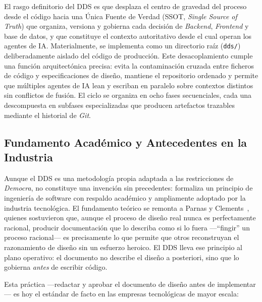 El rasgo definitorio del DDS es que desplaza el centro de gravedad del proceso
desde el código hacia una Única Fuente de Verdad (SSOT, \textit{Single Source of
Truth}) que organiza, versiona y gobierna cada decisión de \textit{Backend},
\textit{Frontend} y base de datos, y que constituye el contexto autoritativo desde
el cual operan los agentes de IA. Materialmente, se implementa como un directorio
raíz (\texttt{dds/}) deliberadamente aislado del código de producción. Este
desacoplamiento cumple una función arquitectónica precisa: evita la contaminación
cruzada entre ficheros de código y especificaciones de diseño, mantiene el
repositorio ordenado y permite que múltiples agentes de IA lean y escriban en
paralelo sobre contextos distintos sin conflictos de fusión. El ciclo se organiza
en ocho fases secuenciales, cada una descompuesta en subfases especializadas que
producen artefactos trazables mediante el historial de \textit{Git}.

\subsection{Fundamento Académico y Antecedentes en la Industria}
\label{subsec:dds_antecedentes}

Aunque el DDS es una metodología propia adaptada a las restricciones de
\textit{Democra}, no constituye una invención sin precedentes: formaliza un
principio de ingeniería de software con respaldo académico y ampliamente adoptado
por la industria tecnológica. El fundamento teórico se remonta a Parnas y
Clements~\cite{parnas1986}, quienes sostuvieron que, aunque el proceso de diseño
real nunca es perfectamente racional, producir documentación que lo describa como
si lo fuera ---``fingir'' un proceso racional--- es precisamente lo que permite que
otros reconstruyan el razonamiento de diseño sin un esfuerzo heroico. El DDS lleva
ese principio al plano operativo: el documento no describe el diseño a posteriori,
sino que lo gobierna \textit{antes} de escribir código.

Esta práctica ---redactar y aprobar el documento de diseño antes de implementar---
es hoy el estándar de facto en las empresas tecnológicas de mayor escala:

